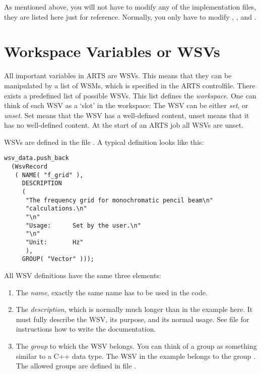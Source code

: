 \vspace{2ex} As mentioned above, you will not have to modify any of
the implementation files, they are listed here just for reference.
Normally, you only have to modify ,
, and .

\section{Workspace Variables or WSVs}
\label{sec:agendas:wsvs}

All important variables in ARTS are WSVs. This means that they can be
manipulated by a list of WSMs, which is specified in the ARTS
controlfile. There exists a predefined list of possible WSVs. This
list defines the \emph{workspace}. One can think of each WSV as a
`slot' in the workspace: The WSV can be either \emph{set}, or
\emph{unset}. Set means that the WSV has a well-defined content, unset
means that it has no well-defined content. At the start of an ARTS job
all WSVs are unset.

WSVs are defined in the file . A typical
definition looks like this:

\begin{lstlisting}
wsv_data.push_back
  (WsvRecord
   ( NAME( "f_grid" ),
     DESCRIPTION
     (
      "The frequency grid for monochromatic pencil beam\n"
      "calculations.\n"
      "\n"
      "Usage:      Set by the user.\n"
      "\n"
      "Unit:       Hz"
      ),
     GROUP( "Vector" )));
\end{lstlisting}

\noindent
All WSV definitions have the same three elements:
\begin{enumerate}
\item The \emph{name}, exactly the
  same name has to be used in the code.
\item The \emph{description}, which is normally much longer than in
  the example here. It must fully describe the WSV, its purpose, and
  its normal usage. See file  for instructions
  how to write the documentation.
\item The \emph{group} to which the WSV belongs. You can think of a
  group as something similar to a C++ data type. The WSV in the
  example belongs to the group . The allowed groups
  are defined in file .
\end{enumerate}

